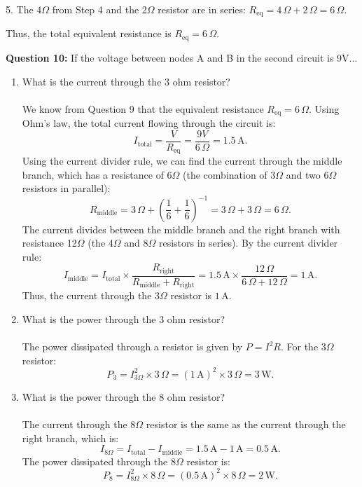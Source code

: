 \documentclass{article}
\begin{document}
5. The 4$\Omega$ from Step 4 and the 2$\Omega$ resistor are in series:  
   \( R_{\text{eq}} = 4 \, \Omega + 2 \, \Omega = 6 \, \Omega \).

Thus, the total equivalent resistance is \( \boxed{ R_{\text{eq}} = 6 \, \Omega } \).
\bigskip


\textbf{Question 10:} If the voltage between nodes A and B in the second circuit is 9V...
\begin{enumerate}
\item What is the current through the 3 ohm resistor?
\\
\\
We know from Question 9 that the equivalent resistance \( R_{\text{eq}} = 6 \, \Omega \). Using Ohm's law, the total current flowing through the circuit is:
    \[
    I_{\text{total}} = \frac{V}{R_{\text{eq}}} = \frac{9V}{6 \, \Omega} = 1.5 \, \text{A}.
    \]
    Using the current divider rule, we can find the current through the middle branch, which has a resistance of 6\(\Omega\) (the combination of 3\(\Omega\) and two 6\(\Omega\) resistors in parallel):
    \[
    R_{\text{middle}} = 3 \, \Omega + \left( \frac{1}{6} + \frac{1}{6} \right)^{-1} = 3 \, \Omega + 3 \, \Omega = 6 \, \Omega.
    \]
    The current divides between the middle branch and the right branch with resistance 12\(\Omega\) (the 4\(\Omega\) and 8\(\Omega\) resistors in series). By the current divider rule:
    \[
    I_{\text{middle}} = I_{\text{total}} \times \frac{R_{\text{right}}}{R_{\text{middle}} + R_{\text{right}}} = 1.5 \, \text{A} \times \frac{12 \, \Omega}{6 \, \Omega + 12 \, \Omega} = 1 \, \text{A}.
    \]
    Thus, the current through the 3\(\Omega\) resistor is \( 1 \, \text{A} \).
\\
\item What is the power through the 3 ohm resistor?
\\
\\
The power dissipated through a resistor is given by \( P = I^2 R \). For the 3\(\Omega\) resistor:
    \[
    P_3 = I_{\text{3}\Omega}^2 \times 3 \, \Omega = (1 \, \text{A})^2 \times 3 \, \Omega = 3 \, \text{W}.
    \]


\item What is the power through the 8 ohm resistor?
\\
\\
The current through the 8\(\Omega\) resistor is the same as the current through the right branch, which is:
    \[
    I_{\text{8}\Omega} = I_{\text{total}} - I_{\text{middle}} = 1.5 \, \text{A} - 1 \, \text{A} = 0.5 \, \text{A}.
    \]
    The power dissipated through the 8\(\Omega\) resistor is:
    \[
    P_8 = I_{\text{8}\Omega}^2 \times 8 \, \Omega = (0.5 \, \text{A})^2 \times 8 \, \Omega = 2 \, \text{W}.
    \]


\end{enumerate}
\end{document}
